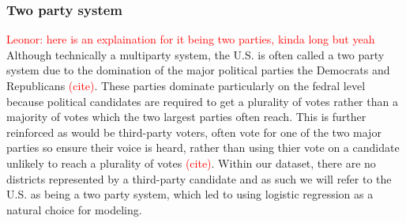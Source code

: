 \documentclass[12pt]{article}
\begin{document}
%
%
%
%
\subsubsection*{Two party system}

\textcolor{red}{Leonor: here is an explaination for it being two parties, kinda long but yeah}
Although technically a multiparty system, the U.S. is often called a two party system due to the domination of the major political parties the Democrats and Republicans \textcolor{red}{(cite)}. These parties dominate particularly on the fedral level because political candidates are required to get a plurality of votes rather than a majority of votes which the two largest parties often reach. This is further reinforced as would be third-party voters, often vote for one of the two major parties so ensure their voice is heard, rather than using thier vote on a candidate unlikely to reach a plurality of votes \textcolor{red}{(cite)}. Within our dataset, there are no districts represented by a third-party candidate and as such we will refer to the U.S. as being a two party system, which led to using logistic regression as a natural choice for modeling. 
\end{document}
